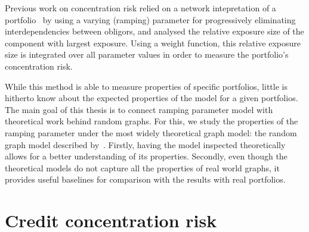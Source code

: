 \documentclass[12pt,beltcrest]{ociamthesis} %
\begin{document}
Previous work on concentration risk relied on a network intepretation of a portfolio~\cite{Sindel:2009vd} by using a varying (ramping) parameter for progressively eliminating interdependencies between obligors, and analysed the relative exposure size of the component with largest exposure.
Using a weight function, this relative exposure size is integrated over all parameter values in order to measure the portfolio's concentration risk.

While this method is able to measure properties of specific portfolios, little is hitherto know about the expected properties of the model for a given portfolios.
The main goal of this thesis is to connect ramping parameter model with theoretical work behind random graphs.
For this, we study the properties of the ramping parameter under the most widely theoretical graph model: the random graph model described by~\cite{erdos1959random}.
Firstly, having the model inspected theoretically allows for a better understanding of its properties.
Secondly, even though the theoretical models do not capture all the properties of real world graphs, it provides useful baselines for comparison with the results with real portfolios.





\section{Credit concentration risk} %
\label{sec:credit_concentration_risk}
\end{document}
